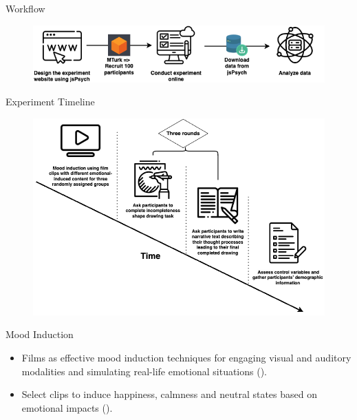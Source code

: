 \documentclass[pdf]{beamer}
\begin{document}
\begin{frame}{Workflow}
\begin{figure}
    \centering
    \includegraphics[width=\textwidth, keepaspectratio]{drawio/Workflow.png}
\end{figure}
\end{frame}

\begin{frame}{Experiment Timeline}
\begin{figure}
    \centering
    \includegraphics[height=0.8\textheight, keepaspectratio]{drawio/Experiment Timeline.png}
\end{figure}
\end{frame}

\begin{frame}{Mood Induction}
\begin{itemize}
    \item<1-> Films as effective mood induction techniques for engaging visual and auditory modalities and simulating real-life emotional situations (\cite{siedlecka_experimental_2019}).
    \item<2-> Select clips to induce happiness, calmness and neutral states based on emotional impacts (\cite{kucera_using_2012}).
\end{itemize}
\end{frame}
\end{document}

